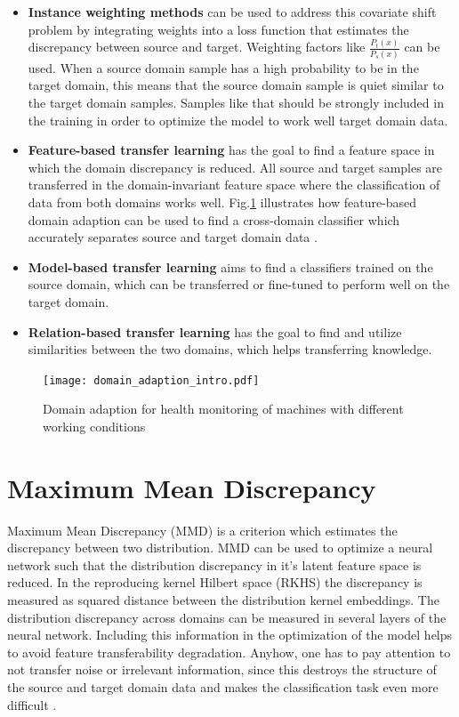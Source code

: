 \begin{itemize}
\item \textbf{Instance weighting methods} can be used to address this covariate shift problem by integrating weights into a loss function that estimates the discrepancy between source and target. Weighting factors like $\frac{P_{t}(x)}{P_{s}(x)}$ can be used. When a source domain sample has a high probability to be in the target domain, this means that the source domain sample is quiet similar to the target domain samples. Samples like that should be strongly included in the training in order to optimize the model to work well target domain data.
\item \textbf{Feature-based transfer learning} has the goal to find a feature space in which the domain discrepancy is reduced. All source and target samples are transferred in the domain-invariant feature space where the classification of data from both domains works well. Fig.\ref{fig:Domain_adaption_intro} illustrates how feature-based domain adaption can be used to find a cross-domain classifier which accurately separates source and target domain data \cite{Pandhare2021}. 
\item \textbf{Model-based transfer learning} aims to find a classifiers trained on the source domain, which can be transferred or fine-tuned to perform well on the target domain.
\item \textbf{Relation-based transfer learning} has the goal to find and utilize similarities between the two domains, which helps transferring knowledge. 
\end{itemize}

\begin{figure}[H]
  \centering
  \texttt{[image: domain\_adaption\_intro.pdf]}
  \caption {Domain adaption for health monitoring of machines with different working conditions \cite{Pandhare2021}} \label{fig:Domain_adaption_intro}
\end{figure}


\section{Maximum Mean Discrepancy}
Maximum Mean Discrepancy (MMD) is a criterion which estimates the discrepancy between two distribution. MMD can be used to optimize a neural network such that the distribution discrepancy in it's latent feature space is reduced. In the reproducing kernel Hilbert space (RKHS) the discrepancy is measured as squared distance between the distribution kernel embeddings. The distribution discrepancy across domains can be measured in several layers of the neural network. Including this information in the optimization of the model helps to avoid feature transferability degradation. Anyhow, one has to pay attention to not transfer noise or irrelevant information, since this destroys the structure of the source and target domain data and makes the classification task even more difficult \cite{li2020}. 

